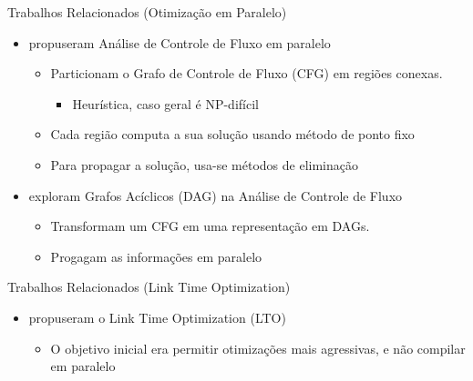 \begin{frame}{Trabalhos Relacionados (Otimização em Paralelo)}

    \begin{itemize}
        \item \cite{Lee1994} propuseram Análise de Controle de Fluxo em paralelo
            \begin{itemize}
                \item Particionam o Grafo de Controle de Fluxo (CFG) em regiões conexas.
                 \begin{itemize}
                    \item Heurística, caso geral é NP-difícil
                 \end{itemize}
                \item Cada região computa a sua solução usando método de ponto fixo
                \item Para propagar a solução, usa-se métodos de eliminação
            \end{itemize}
        \item \cite{kramer1994combining} exploram Grafos Acíclicos (DAG) na Análise de Controle de Fluxo
            \begin{itemize}
                \item Transformam um CFG em uma representação em DAGs.
                \item Progagam as informações em paralelo
            \end{itemize}
    \end{itemize}
\end{frame}

\begin{frame}{Trabalhos Relacionados (Link Time Optimization)}

    \begin{itemize}
        \item \cite{whoprgoogle} propuseram o Link Time Optimization (LTO)
            \begin{itemize}
                \item O objetivo inicial era permitir otimizações mais agressivas, e não compilar em paralelo
            \end{itemize}
    \end{itemize}
\end{frame}

